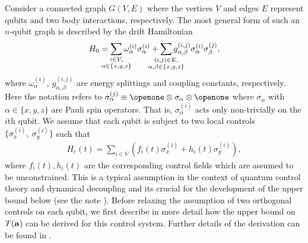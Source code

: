 \documentclass[aps,twocolumn,amsmath,amssymb,nofootinbib,superscriptaddress]{revtex4-1}
\begin{document}
Consider a connected graph $G(V,E)$  where the vertices $V$ and edges $E$ represent qubits and two body interactions, respectively. The most general form of such an $n$-qubit graph is described by the drift Hamiltonian
\begin{align}
\label{eq:driftH}
H_{0}=\sum_{\mathclap{\substack{i\in V, \\  \alpha\in\{x,y,z\}}}}\omega_{\alpha}^{(i)}\sigma_{\alpha}^{(i)}+\sum_{\mathclap{\substack{(i, j)\in E,\\\alpha,\beta\in\{x,y,z\}}}}g_{\alpha,\beta}^{(i,j)}\sigma_{\alpha}^{(i)}\sigma_{\beta}^{(j)},
\end{align}
where $\omega_{\alpha}^{(i)},~g_{\alpha,\beta}^{(i,j)}$ are energy splittings and coupling constants, respectively.  
Here the notation refers to $\sigma_{\alpha}^{(j)}\equiv\openone\otimes \sigma_{\alpha}\otimes  \openone$ where $\sigma_{\alpha}$ with $\alpha\in\{x,y,z\}$ are Pauli spin operators. That is, $\sigma_{\alpha}^{(i)}$ acts only non-trivially on the $i$th qubit. We assume that each qubit is subject to two local controls $\{\sigma_{x}^{(i)},~\sigma_{y}^{(i)}\}$ such that
\begin{align}
\label{eq:controlH}
H_{c}(t)=\sum_{i\in V}(f_{i}(t)\sigma_{x}^{(i)}+h_{i}(t)\sigma_{y}^{(i)}),	
\end{align}
where $f_{i}(t),h_{i}(t)$ are the corresponding control fields which are assumed to be unconstrained. This is a typical assumption in the context of quantum control theory and dynamical decoupling and its crucial for the development of the upper bound below (see the note \cite{Comment1}). Before relaxing the assumption of two orthogonal controls on each qubit, we first describe in more detail how the upper bound on $T(\bold{a})$ can be derived for this control system. Further details of the derivation can be found in \cite{OnlineMaterial}.  
\end{document}
